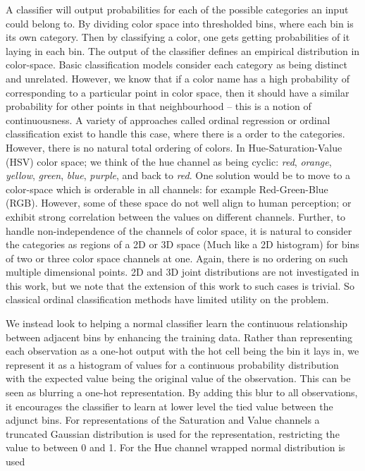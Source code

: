 \documentclass[11pt,letterpaper]{article}
\begin{document}
A classifier will output probabilities for each of the possible categories an input could belong to.
By dividing color space into thresholded bins, where each bin is its own category.
Then by classifying a color, one gets getting probabilities of it laying in each bin. The output of the classifier defines an empirical distribution in color-space.
Basic classification models consider each category as being distinct and unrelated.
However, we know that if a color name has a high probability of corresponding to a particular point in color space, then it should have a similar probability for other points in that neighbourhood -- this is a notion of continuousness.
A variety of approaches called ordinal regression or ordinal classification exist to handle this case, where there is a order to the categories.
However, there is no natural total ordering of colors.
In Hue-Saturation-Value (HSV) color space; we think of the hue channel 
 as being cyclic: \emph{red}, \emph{orange}, \emph{yellow}, \emph{green}, \emph{blue}, \emph{purple}, and back to \emph{red}.
One solution would be to move to a color-space which is orderable in all channels: for example Red-Green-Blue (RGB).
However, some of these space do not well align to human perception; or exhibit strong correlation between the values on different channels.
Further, to handle non-independence of the channels of color space, it is natural to consider the categories as regions of a 2D or 3D space (Much like a 2D histogram) for bins of two or three color space channels at one.
Again, there is no ordering on such multiple dimensional points.
2D and 3D joint distributions are not investigated in this work, but we note that the extension of this work to such cases is trivial.
So classical ordinal classification methods have limited utility on the problem.

We instead look to helping a normal classifier learn the continuous relationship between adjacent bins by enhancing the training data.
Rather than representing each observation as a one-hot output with the hot cell being the bin it lays in, we represent it as a histogram of values for a continuous probability distribution with the expected value being the original value of the observation.
This can be seen as blurring a one-hot representation.
By adding this blur to all observations, it encourages the classifier to learn at lower level the tied value between the adjunct bins.
For representations of the Saturation and Value channels a truncated Gaussian distribution is used for the representation, restricting the value to between 0 and 1.
For the Hue channel wrapped normal distribution is used
\end{document}
